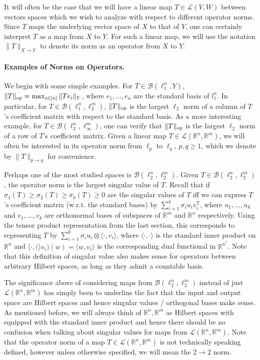 \documentclass[11pt]{article}
\theoremstyle{plain}
\theoremstyle{plain}
\newcommand{\T}{\ensuremath{\mathsf{T}}}
\newcommand{\R}{\ensuremath{\mathbb{R}}}
\newcommand{\pr}[2]{\langle{#1, #2}\rangle}
\begin{document}
It will often be the case that we will have a linear map $T \in
\mathcal{L}(V,W)$ between vectors spaces which we wish to analyze with respect
to different operator norms. Since $T$ maps the underlying vector space of $X$
to that of $Y$, one can certainly interpret $T$ as a map from $X$ to $Y$. For
such a linear map, we will use the notation $\|T\|_{X \rightarrow Y}$ to denote
its norm as an operator from $X$ to $Y$.

\paragraph{\bf Examples of Norms on Operators.}

We begin with some simple examples. For $T \in \mathcal{B}(\ell_1^n,Y)$,
$\|T\|_{\rm op} = \max_{i \in [n]} \|Te_i\|_Y$, where $e_1,\dots,e_n$ are the
standard basis of $l_1^n$. In particular, for $T \in
\mathcal{B}(\ell_1^n,\ell_2^m)$, $\|T\|_{\rm op}$ is the largest $\ell_2$ norm
of a column of $T$'s coefficient matrix with respect to the standard basis. As a
more interesting example, for $T \in \mathcal{B}(\ell_2^n,\ell_\infty^m)$, one
can verify that $\|T\|_{\rm op}$ is the largest $\ell_2$ norm of a row of $T$'s
coefficient matrix. Given a linear map $T \in \mathcal{L}(\R^n,\R^m)$, we will
often be interested in its operator norm from $\ell_p$ to $\ell_q$, $p,q \geq
1$, which we denote by $\|T\|_{p \rightarrow q}$ for convenience. 

Perhaps one of the most studied spaces is $\mathcal{B}(\ell_2^n,\ell^m_2)$.
Given $T \in \mathcal{B}(\ell_2^n,\ell_2^m)$, the operator norm is the largest
singular value of $T$. Recall that if $\sigma_1(T) \geq \sigma_2(T) \geq
\sigma_k(T) \geq 0$ are the singular values of $T$ iff we can express $T$'s
coefficient matrix (w.r.t. the standard bases) by $\sum_{i=1}^k \sigma_i u_i
v_i^\T$, where $u_1,\dots,u_k$ and $v_1,\dots,v_k$ are orthonormal bases of
subspaces of $\R^m$ and $\R^n$ respectively. Using the tensor product
representation from the last section, this corresponds to representing $T$ by
$\sum_{i=1}^k \sigma_i u_i \otimes \pr{\cdot}{v_i}$, where $\pr{\cdot}{\cdot}$
is the standard inner product on $\R^n$ and $\pr{\cdot}(v_i)(w) = \pr{w}{v_i}$
is the corresponding dual functional in $\R^{n^*}$. Note that this definition
of singular value also makes sense for operators between arbitrary Hilbert
spaces, as long as they admit a countable basis.  

The significance above of considering maps from
$\mathcal{B}(\ell_2^n,\ell_2^m)$ instead of just $\mathcal{L}(\R^n,\R^m)$ has
simply been to underline the fact that the input and output space are Hilbert
spaces and hence singular values / orthogonal bases make sense. As mentioned
before, we will always think of $\R^n, \R^m$ as Hilbert spaces with equipped
with the standard inner product and hence there should be no confusion when
talking about singular values for maps from $\mathcal{L}(\R^n,\R^m)$. Note that
the operator norm of a map $T \in \mathcal{L}(\R^n,\R^m)$ is not technically
speaking defined, however unless otherwise specified, we will mean the $2
\rightarrow 2$ norm. 
\end{document}
